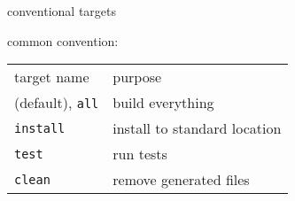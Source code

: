 \begin{frame}{conventional targets}

common convention: \\
\begin{tabular}{l|l}
target name & purpose \\
(default), \texttt{all} & build everything \\
\texttt{install} & install to standard location \\
\texttt{test} & run tests \\
\texttt{clean} & remove generated files \\
\end{tabular}
\end{frame}
